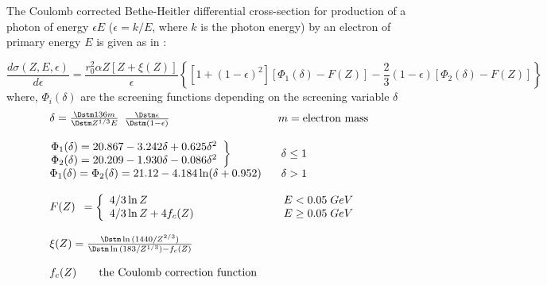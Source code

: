 \begin{bibunit}[unsrt]
The Coulomb corrected Bethe-Heitler differential cross-section for
production of a photon of energy $\epsilon E$ 
($\epsilon = k/E$, where $k$ is the photon energy)
by an electron of primary energy $E$ is given as in 
:
 
\begin{equation}
\frac{d\sigma(Z,E,\epsilon)} {d \epsilon} =
      \frac{r_0^2 \alpha Z[Z +\xi(Z)]}{\epsilon}
    \left\{[1+(1 -\epsilon)^2][\Phi_1(\delta )
   - F(Z)] -\frac{2} {3}(1 - \epsilon)[\Phi_2(\delta) - F(Z)]\right\}
\end{equation}
where, $\Phi_i(\delta)$ are the screening functions depending on the screening
variable $\delta$
\[ \begin{array}{ll}

\begin{array}{l}
\delta  =  \frac {\Dstm 136m}{\Dstm Z^{1/3}E} \end{array}
            \frac{\Dstm \epsilon}{\Dstm (1-\epsilon)}
              &        m = \mbox{electron mass} \\
& \\
\noindent \left.\begin{array}{l}
\Phi_1(\delta)  =  20.867 - 3.242\delta +0.625\delta^2  \\
\Phi_2(\delta)  =  20.209 - 1.930\delta - 0.086\delta^2  \\
\end{array}        \right\} & \; \delta\leq 1 \\
\begin{array}{l} \Phi_1(\delta) = \Phi_2(\delta) =  
21.12 - 4.184 \ln(\delta+0.952) \end{array} 
                    & \; \delta > 1  \\
&\\
\begin{array}{l} F(Z) \end{array}  = \left\{\begin{array}{l}
        4/3 \ln Z          \\
        4/3 \ln Z+4f_c(Z)  \\
        \end{array}\right.      
&  \begin{array}{l}
E<0.05 \; GeV      \\
E\geq 0.05 \; GeV  \\
\end{array}  \\
\\
\begin{array}{l}  \xi(Z)=\frac{\Dstm\ln {(1440/Z^{2/3})}}{\Dstm\ln
{(183/Z^{1/3})}-f_c(Z)} \end{array}  & \\
\\
\begin{array}{l} f_c(Z) \mbox{\qquad the Coulomb correction function}
\end{array}  \\
\end{array} \]


\end{bibunit}
